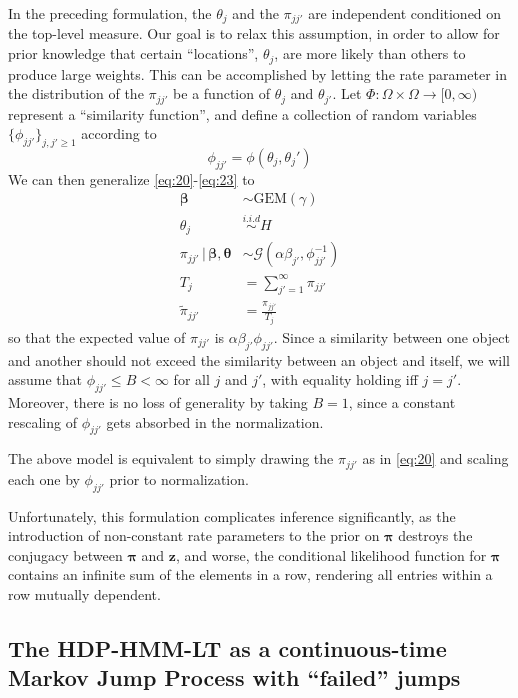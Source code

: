 \documentclass[12pt,letterpaper]{report}
\newcommand{\Gamm}[2]{\mathcal{G}(#1,#2)}
\newcommand{\given}{\, \vert \,}
\newcommand{\bz}{\mathbf{z}}
\newcommand{\bbeta}{\boldsymbol{\beta}}
\newcommand{\btheta}{\boldsymbol{\theta}}
\newcommand{\bpi}{\boldsymbol{\pi}}
\begin{document}
In the preceding formulation, the $\theta_j$ and the $\pi_{jj'}$ are independent
conditioned on the top-level measure.  Our goal is to relax this
assumption, in order to allow for prior knowledge
that certain ``locations'', $\theta_j$, are more likely than others to
produce large weights.  This can be accomplished by letting the rate
parameter in the distribution of the $\pi_{jj'}$
be a function of $\theta_j$ and $\theta_{j'}$.  
Let $\Phi: \Omega \times \Omega \to [0,\infty)$ represent a
``similarity function'', and define a collection of random variables
$\{\phi_{jj'}\}_{j,j' \geq 1}$ according to
\begin{equation}
  \phi_{jj'} = \phi(\theta_j, \theta_j')
\end{equation}
We can then generalize \eqref{eq:20}-\eqref{eq:23} to
\begin{align}
  \bbeta &\sim \mathrm{GEM}(\gamma) \\
  \theta_j &\stackrel{i.i.d}{\sim} H \\
  \pi_{jj'} \given \bbeta, \btheta &\sim \Gamm{\alpha \beta_{j'}}{\phi_{jj'}^{-1}} \\
  T_j &= \sum_{j'=1}^{\infty} \pi_{jj'} \\
  \tilde{\pi}_{jj'} &= \frac{\pi_{jj'}}{T_j}
\end{align}
so that the expected value of $\pi_{jj'}$ is
$\alpha\beta_{j'}\phi_{jj'}$.  Since a similarity between one object
and another should not exceed the similarity between an object and
itself, we will assume that $\phi_{jj'} \leq B < \infty$ for all $j$
and $j'$, with equality holding iff $j = j'$.  Moreover, there 
is no loss of generality by taking $B = 1$, since a constant rescaling of
$\phi_{jj'}$ gets absorbed in the normalization.

The above model is equivalent to simply drawing the $\pi_{jj'}$ as in
\eqref{eq:20} and scaling each one by $\phi_{jj'}$ prior to
normalization.

Unfortunately, this formulation complicates inference significantly,
as the introduction of non-constant rate parameters to the prior on
$\bpi$ destroys the conjugacy between $\bpi$ and $\bz$, and worse, the
conditional likelihood function for $\bpi$ contains an infinite
sum of the elements in a row, rendering all entries within a row
mutually dependent.

\subsection{The HDP-HMM-LT as a continuous-time 
Markov Jump Process with ``failed'' jumps}
\label{sec:dist-based-filt}
\end{document}
